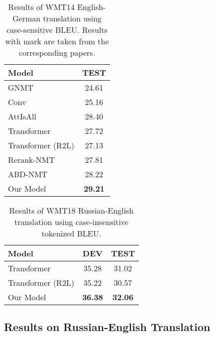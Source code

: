 \documentclass[11pt,a4paper]{article}
\begin{document}
\begin{CJK*}{UTF8}{gbsn}
\begin{table}
	\centering
	\begin{tabular}{l|c}
		\hline
		Model              &    TEST               \\
		\hline
		\hline
		GNMT~\cite{Wu:2016}                 &         24.61            \\
		Conv~\cite{gehring2017convolutional}     &           25.16          \\
		AttIsAll~\cite{vaswani2017attention}     &      28.40        \\
		\hline
		\hline
		Transformer\footnotemark[11]   &       27.72     \\
		Transformer (R2L)  &      27.13          \\
		Rerank-NMT          &     27.81      \\
		ABD-NMT           &     28.22      \\ \hline
		\hline
		Our Model         &     \textbf{29.21}     \\		
		\hline
	\end{tabular}
	\caption{Results of WMT14 English-German translation using case-sensitive BLEU. 
		Results with  mark are taken from the corresponding papers.
	} \label{EN-GE}
\end{table}

\begin{table}
	\centering
	\begin{tabular}{l|cc}
		\hline
		Model              &  DEV &  TEST               \\
		\hline
		\hline
		Transformer       &  35.28     &   31.02     \\
		Transformer (R2L)  &  35.22     &    30.57          \\
		Our Model         &   \textbf{36.38}    &   \textbf{32.06}     \\	
		\hline
	\end{tabular}
	\caption{Results of WMT18 Russian-English translation using case-insensitive tokenized BLEU.
	} \label{Ru-En}
\end{table}

\subsection{Results on Russian-English Translation}


\end{CJK*}
\end{document}
